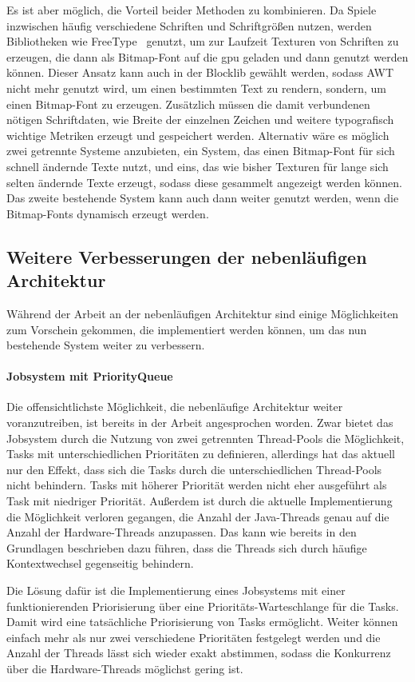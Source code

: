 \documentclass[12pt,a4paper,listof=toc,parskip=half,numbers=noenddot,abstract=true]{scrartcl}
\begin{document}
Es ist aber möglich, die Vorteil beider Methoden zu kombinieren. Da Spiele inzwischen häufig verschiedene Schriften und Schriftgrößen nutzen, werden Bibliotheken wie FreeType~\cite{TheFreeTypeProject,Vries2020} genutzt, um zur Laufzeit Texturen von Schriften zu erzeugen, die dann als Bitmap-Font auf die \ac{gpu} geladen und dann genutzt werden können. Dieser Ansatz kann auch in der Blocklib gewählt werden, sodass AWT nicht mehr genutzt wird, um einen bestimmten Text zu rendern, sondern, um einen Bitmap-Font zu erzeugen. Zusätzlich müssen die damit verbundenen nötigen Schriftdaten, wie Breite der einzelnen Zeichen und weitere typografisch wichtige Metriken erzeugt und gespeichert werden. Alternativ wäre es möglich zwei getrennte Systeme anzubieten, ein System, das einen Bitmap-Font für sich schnell ändernde Texte nutzt, und eins, das wie bisher Texturen für lange sich selten ändernde Texte erzeugt, sodass diese gesammelt angezeigt werden können. Das zweite bestehende System kann auch dann weiter genutzt werden, wenn die Bitmap-Fonts dynamisch erzeugt werden.

\subsection{Weitere Verbesserungen der nebenläufigen Architektur}
Während der Arbeit an der nebenläufigen Architektur sind einige Möglichkeiten zum Vorschein gekommen, die implementiert werden können, um das nun bestehende System weiter zu verbessern.
\paragraph{Jobsystem mit PriorityQueue}
Die offensichtlichste Möglichkeit, die nebenläufige Architektur weiter voranzutreiben, ist bereits in der Arbeit angesprochen worden. Zwar bietet das Jobsystem durch die Nutzung von zwei getrennten Thread-Pools die Möglichkeit, Tasks mit unterschiedlichen Prioritäten zu definieren, allerdings hat das aktuell nur den Effekt, dass sich die Tasks durch die unterschiedlichen Thread-Pools nicht behindern. Tasks mit höherer Priorität werden nicht eher ausgeführt als Task mit niedriger Priorität. Außerdem ist durch die aktuelle Implementierung die Möglichkeit verloren gegangen, die Anzahl der Java-Threads genau auf die Anzahl der Hardware-Threads anzupassen. Das kann wie bereits in den Grundlagen beschrieben dazu führen, dass die Threads sich durch häufige Kontextwechsel gegenseitig behindern.

Die Lösung dafür ist die Implementierung eines Jobsystems mit einer funktionierenden Priorisierung über eine Prioritäts-Warteschlange für die Tasks. Damit wird eine tatsächliche Priorisierung von Tasks ermöglicht. Weiter können einfach mehr als nur zwei verschiedene Prioritäten festgelegt werden und die Anzahl der Threads lässt sich wieder exakt abstimmen, sodass die Konkurrenz über die Hardware-Threads möglichst gering ist.
\end{document}
